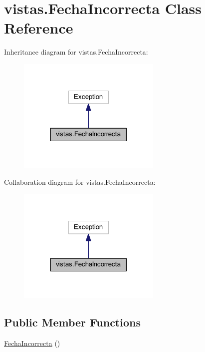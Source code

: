 \hypertarget{classvistas_1_1_fecha_incorrecta}{}\section{vistas.\+Fecha\+Incorrecta Class Reference}
\label{classvistas_1_1_fecha_incorrecta}


Inheritance diagram for vistas.\+Fecha\+Incorrecta\+:
\nopagebreak
\begin{figure}[H]
\begin{center}
\leavevmode
\includegraphics[width=194pt]{classvistas_1_1_fecha_incorrecta__inherit__graph}
\end{center}
\end{figure}


Collaboration diagram for vistas.\+Fecha\+Incorrecta\+:
\nopagebreak
\begin{figure}[H]
\begin{center}
\leavevmode
\includegraphics[width=194pt]{classvistas_1_1_fecha_incorrecta__coll__graph}
\end{center}
\end{figure}
\subsection*{Public Member Functions}
\begin{DoxyCompactItemize}
\item 
\mbox{\hyperlink{classvistas_1_1_fecha_incorrecta_a665fd9b590023e898707e58c08a4b8e2}{Fecha\+Incorrecta}} ()
\end{DoxyCompactItemize}


